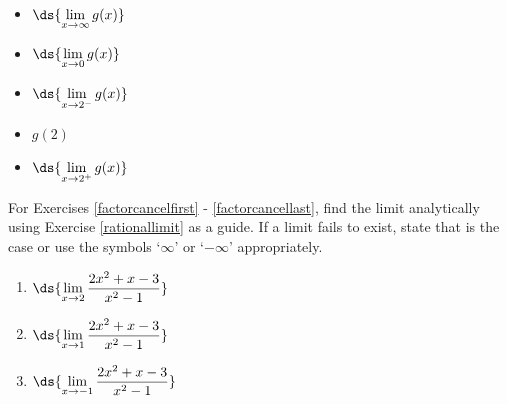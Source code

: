 \documentclass{ximera}
\begin{document}
\begin{enumerate}
\begin{multicols}{4}
\begin{itemize}
\item  $\ds{\lim_{x \rightarrow \infty} g(x)}$

\end{itemize}

\end{multicols}

\bigskip

\begin{multicols}{4}

\begin{itemize}

\item $\ds{\lim_{x \rightarrow 0} g(x)}$

\item $\ds{\lim_{x \rightarrow 2^{-}} g(x)}$

\item  $g(2)$

\item $\ds{\lim_{x \rightarrow 2^{+}} g(x)}$
\end{itemize}

\end{multicols}

\bigskip

\setcounter{HW}{\value{enumi}}
\end{enumerate}

For Exercises \ref{factorcancelfirst} - \ref{factorcancellast}, find the limit analytically using Exercise \ref{rationallimit} as a guide.  If a limit fails to exist, state that is the case  or use the symbols `$\infty$' or `$-\infty$' appropriately.
 
\begin{multicols}{3}

\begin{enumerate}
\setcounter{enumi}{\value{HW}}

\item\label{factorcancelfirst}  $\ds{\lim_{x \rightarrow 2} \dfrac{2x^2+x-3}{x^2-1}}$
  
\item  $\ds{\lim_{x \rightarrow 1} \dfrac{2x^2+x-3}{x^2-1}}$

\item   $\ds{\lim_{x \rightarrow -1} \dfrac{2x^2+x-3}{x^2-1}}$

\setcounter{HW}{\value{enumi}}
\end{enumerate}

\end{multicols}
\end{document}
